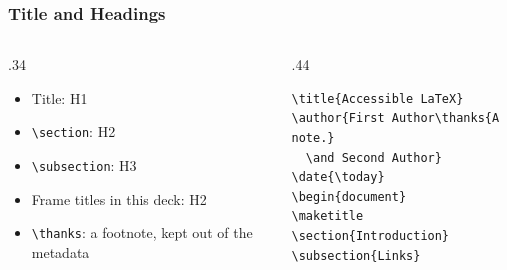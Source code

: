 \documentclass{ltx-talk}
\begin{document}
\begin{frame*}
  \frametitle{Title and Headings}
  \begin{columns}
    \begin{column}{.34\textwidth}
      \begin{itemize}
        \item Title: H1
        \item \verb|\section|: H2
        \item \verb|\subsection|: H3
        \item Frame titles in this deck: H2
        \item \verb|\thanks|: a footnote, kept out of the metadata
      \end{itemize}
    \end{column}
    \begin{column}{.44\textwidth}
\small
\begin{verbatim}
\title{Accessible LaTeX}
\author{First Author\thanks{A note.}
  \and Second Author}
\date{\today}
\begin{document}
\maketitle
\section{Introduction}
\subsection{Links}
\end{verbatim}
    \end{column}
  \end{columns}
\end{frame*}
\end{document}
